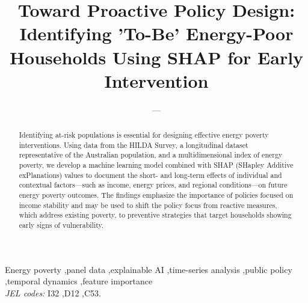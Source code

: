 \documentclass[preprint,authoryear,12pt]{elsarticle}
\begin{document}
\begin{frontmatter}

\title{Toward Proactive Policy Design: Identifying 'To-Be' Energy-Poor Households Using SHAP for Early Intervention }

\author{---}





\begin{abstract}
Identifying at-risk populations is essential for designing effective energy poverty interventions. Using data from the HILDA Survey, a longitudinal dataset representative of the Australian population, and a multidimensional index of energy poverty, we develop a machine learning model combined with SHAP (SHapley Additive exPlanations) values to document the short- and long-term effects of individual and contextual factors—such as income, energy prices, and regional conditions—on future energy poverty outcomes. The findings emphasize the importance of policies focused on income stability and may be used to shift the policy focus from reactive measures, which address existing poverty, to preventive strategies that target households showing early signs of vulnerability.
\end{abstract}

\begin{keyword}
Energy poverty \sep panel data \sep explainable AI \sep time-series analysis \sep public policy \sep temporal dynamics \sep feature importance
\\
\textit{JEL codes:} I32 \sep D12 \sep C53.
\end{keyword}



\end{frontmatter}




\end{document}
